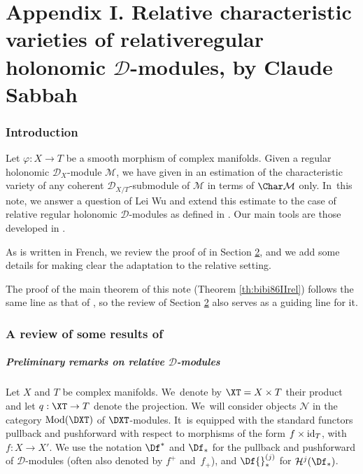 \documentclass{amsart}
\theoremstyle{plain}
\numberwithin{theorem}{section}
\theoremstyle{definition}
\theoremstyle{remark}
\theoremstyle{definition}
\newcommand{\cD}{\mathcal{D}}
\newcommand{\cH}{\mathcal{H}}
\newcommand{\cM}{\mathcal{M}}
\newcommand{\cN}{\mathcal{N}}
\newcommand{\Mod}{\textup{Mod}}
\newcommand{\id}{\textup{id}}
\begin{document}
\part*{Appendix I. Relative characteristic varieties of relative\nobreakspace regular holonomic $\mathcal D$-modules, \textnormal{by Claude Sabbah \protect\footnotemark}}
\egroup

\section{Introduction}
Let $\varphi:X\to T$ be a smooth morphism of complex manifolds. Given a regular holonomic $\cD_X$-module $\cM$, we have given in \cite[Th.\,3.2]{Sab2} an estimation of the characteristic variety of any coherent $\cD_{X/T}$-submodule of $\cM$ in terms of $\Char\cM$ only. In~this note, we answer a question of Lei Wu and extend this estimate to the case of relative regular holonomic $\cD$-modules as defined in \cite{MF-S16}. Our main tools are those developed in \cite[\S\S2--4]{FFS23}.

As \cite{Sab2} is written in French, we review the proof of \cite[Th.\,3.2]{Sab2} in Section \ref{sec:absolute}, and we add some details for making clear the adaptation to the relative setting.

The proof of the main theorem of this note (Theorem \ref{th:bibi86IIrel}) follows the same line as that of \cite[Th.\,3.2]{Sab2}, so the review of Section \ref{sec:absolute} also serves as a guiding line for it.

\section{A review of some results of \cite{Sab2}}\label{sec:absolute}

\label{subsec:absolute}
\subsubsection*{Preliminary remarks on relative $\cD$-modules}

Let $X$ and $T$ be complex manifolds. We~denote by $\XT=X\times T$ their product and let $q:\XT\to T$ denote the projection. We~will consider objects $\cN$ in the category $\Mod(\DXT)$ of $\DXT$-modules. It~is equipped with the standard functors pullback and pushforward with respect to morphisms of the form $f\times\id_T$, with $f:X\to X'$. We use the notation $\Df^*$ and $\Df_*$ for the pullback and pushforward of $\cD$-modules (often also denoted by $f^+$ and~$f_+$), and $\Df{}^{(j)}_*$ for $\cH^j(\Df_*)$.
\end{document}
